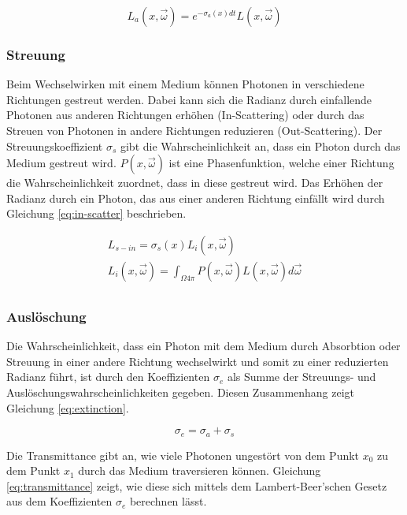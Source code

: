 \begin{equation}
    L_a(x, \vec{\omega}) = e^{-\sigma_a(x)dt} L(x, \vec{\omega})
    \label{eq:absorbtion}
\end{equation}

\subsubsection{Streuung}
Beim Wechselwirken mit einem Medium können Photonen in verschiedene Richtungen gestreut werden. Dabei kann sich die Radianz durch einfallende Photonen aus anderen Richtungen erhöhen (In-Scattering) oder durch das Streuen von Photonen in andere Richtungen reduzieren (Out-Scattering). Der Streuungskoeffizient $ \sigma_s $ gibt die Wahrscheinlichkeit an, dass ein Photon durch das Medium gestreut wird. $ P(x, \vec{\omega}) $ ist eine Phasenfunktion, welche einer Richtung die Wahrscheinlichkeit zuordnet, dass in diese gestreut wird. Das Erhöhen der Radianz durch ein Photon, das aus einer anderen Richtung einfällt wird durch Gleichung \ref{eq:in-scatter} beschrieben.

\begin{multline}
    L_{s-in} = \sigma_s(x) L_i(x, \vec{\omega})\\
    L_i(x, \vec{\omega}) = \int_{\Omega 4 \pi}^{}P(x, \vec{\omega}) L(x, \vec{\omega}) d\vec{\omega}\\
    \label{eq:in-scatter}
\end{multline}

\subsubsection{Auslöschung}
Die Wahrscheinlichkeit, dass ein Photon mit dem Medium durch Absorbtion oder Streuung in einer andere Richtung wechselwirkt und somit zu einer reduzierten Radianz führt, ist durch den Koeffizienten $ \sigma_e $ als Summe der Streuungs- und Auslöschungswahrscheinlichkeiten gegeben. Diesen Zusammenhang zeigt Gleichung \ref{eq:extinction}.

\begin{equation}
    \sigma_e = \sigma_a + \sigma_s
    \label{eq:extinction}
\end{equation}

Die Transmittance gibt an, wie viele Photonen ungestört von dem Punkt $ x_0 $ zu dem Punkt $ x_1 $ durch das Medium traversieren können. Gleichung \ref{eq:transmittance} zeigt, wie diese sich mittels dem Lambert-Beer’schen Gesetz aus dem Koeffizienten $ \sigma_e $ berechnen lässt.

